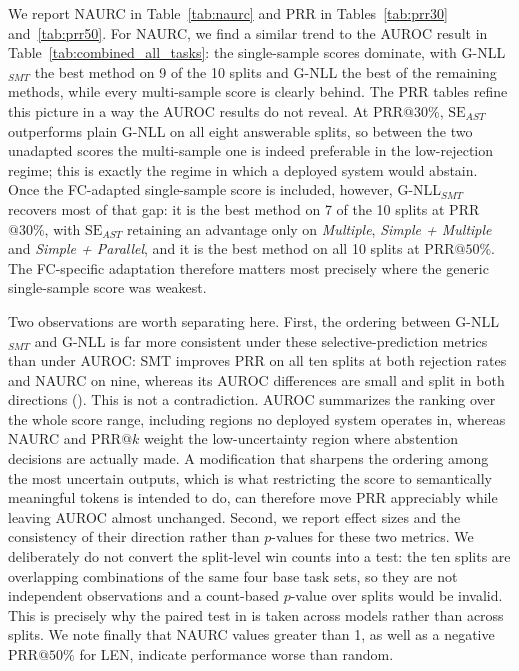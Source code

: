 We report NAURC in Table~\ref{tab:naurc} and PRR in Tables~\ref{tab:prr30} and~\ref{tab:prr50}. For NAURC, we find a similar trend to the AUROC result in Table~\ref{tab:combined_all_tasks}: the single-sample scores dominate, with G-NLL$_{SMT}$ the best method on 9 of the 10 splits and G-NLL the best of the remaining methods, while every multi-sample score is clearly behind. The PRR tables refine this picture in a way the AUROC results do not reveal. At PRR$@30\%$, $\text{SE}_{AST}$ outperforms plain G-NLL on all eight answerable splits, so between the two unadapted scores the multi-sample one is indeed preferable in the low-rejection regime; this is exactly the regime in which a deployed system would abstain. Once the FC-adapted single-sample score is included, however, G-NLL$_{SMT}$ recovers most of that gap: it is the best method on 7 of the 10 splits at PRR$@30\%$, with $\text{SE}_{AST}$ retaining an advantage only on \emph{Multiple}, \emph{Simple + Multiple} and \emph{Simple + Parallel}, and it is the best method on all 10 splits at PRR$@50\%$. The FC-specific adaptation therefore matters most precisely where the generic single-sample score was weakest.

Two observations are worth separating here. First, the ordering between G-NLL$_{SMT}$ and G-NLL is far more consistent under these selective-prediction metrics than under AUROC: SMT improves PRR on all ten splits at both rejection rates and NAURC on nine, whereas its AUROC differences are small and split in both directions (). This is not a contradiction. AUROC summarizes the ranking over the whole score range, including regions no deployed system operates in, whereas NAURC and PRR$@k$ weight the low-uncertainty region where abstention decisions are actually made. A modification that sharpens the ordering among the most uncertain outputs, which is what restricting the score to semantically meaningful tokens is intended to do, can therefore move PRR appreciably while leaving AUROC almost unchanged. Second, we report effect sizes and the consistency of their direction rather than $p$-values for these two metrics. We deliberately do not convert the split-level win counts into a test: the ten splits are overlapping combinations of the same four base task sets, so they are not independent observations and a count-based $p$-value over splits would be invalid. This is precisely why the paired test in  is taken across models rather than across splits. We note finally that NAURC values greater than 1, as well as a negative PRR$@50\%$ for LEN, indicate performance worse than random.


